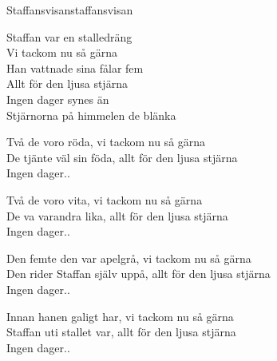 \begin{song}{Staffansvisan}{staffansvisan}
\begin{vers}
Staffan var en stalledräng\\
Vi tackom nu så gärna\\
Han vattnade sina fålar fem\\
Allt för den ljusa stjärna\\
Ingen dager synes än\\
Stjärnorna på himmelen de blänka\\
\end{vers}
\begin{vers}
Två de voro röda, vi tackom nu så gärna\\
De tjänte väl sin föda, allt för den ljusa stjärna\\
Ingen dager..\\
\end{vers}
\begin{vers}
Två de voro vita, vi tackom nu så gärna\\
De va varandra lika, allt för den ljusa stjärna\\
Ingen dager..\\
\end{vers}
\begin{vers}
Den femte den var apelgrå, vi tackom nu så gärna\\
Den rider Staffan själv uppå, allt för den ljusa stjärna\\
Ingen dager..\\
\end{vers}
\begin{vers}
Innan hanen galigt har, vi tackom nu så gärna\\
Staffan uti stallet var, allt för den ljusa stjärna\\
Ingen dager..\\
\end{vers}
\end{song}
